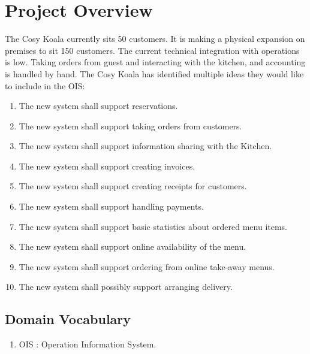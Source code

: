 \documentclass{article}
\begin{document}
\section{Project Overview}
The Cosy Koala currently sits 50 customers. It is making a physical expansion on premises to sit 150 customers. The current technical integration with operations is low. Taking orders from guest and interacting with the kitchen, and accounting is handled by hand.
The Cosy Koala has identified multiple ideas they would like to include in the OIS:
\begin{enumerate}
    \item The new system shall support reservations.
    \item The new system shall support taking orders from customers.
    \item The new system shall support information sharing with the Kitchen.
    \item The new system shall support creating invoices.
    \item The new system shall support creating receipts for customers.
    \item The new system shall support handling payments.
    \item The new system shall support basic statistics about ordered menu items.
    \item The new system shall support online availability of the menu.
    \item The new system shall support ordering from online take-away menus.
    \item The new system shall possibly support arranging delivery.
\end{enumerate}

\subsection{Domain Vocabulary}
\begin{enumerate}
    \item OIS : Operation Information System.
\end{enumerate}
\end{document}
